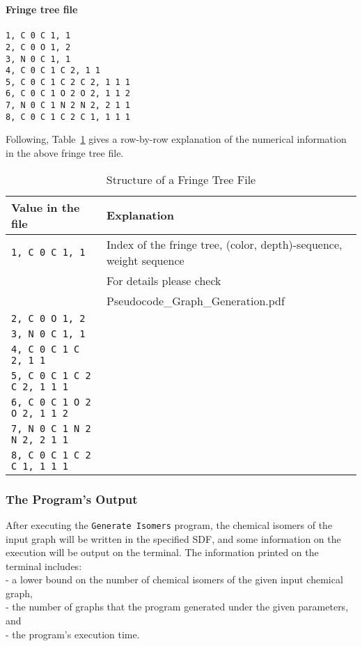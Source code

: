 \documentclass[11pt,titlepage,dvipdfmx,twoside]{article}
\begin{document}
\begin{oframed}
{\bf Fringe tree file}\\\\
{\tt1, C 0 C 1, 1            \\
2, C 0 O 1, 2            \\
3, N 0 C 1, 1            \\
4, C 0 C 1 C 2, 1 1      \\
5, C 0 C 1 C 2 C 2, 1 1 1\\
6, C 0 C 1 O 2 O 2, 1 1 2\\
7, N 0 C 1 N 2 N 2, 2 1 1\\
8, C 0 C 1 C 2 C 1, 1 1 1}\\
\end{oframed}
Following, Table~\ref{tab:fringeFormat}
gives a row-by-row explanation of the numerical information in the
above fringe tree file.
\bigskip
\begin{table}[H]
\begin{center} \caption{Structure of a Fringe Tree File}
\label{tab:fringeFormat}
  \begin{tabular}{l|l}
  Value in the file & Explanation \\ \hline \hline
{\tt  1, C 0 C 1, 1} & Index of the fringe tree, (color, depth)-sequence, weight sequence \\
      & For details please check \\
      & Pseudocode\_Graph\_Generation.pdf\\  \hline
{\tt 2, C 0 O 1, 2            } &\\
{\tt 3, N 0 C 1, 1            } &\\
{\tt 4, C 0 C 1 C 2, 1 1      } &\\
{\tt 5, C 0 C 1 C 2 C 2, 1 1 1} &\\
{\tt 6, C 0 C 1 O 2 O 2, 1 1 2} &\\
{\tt 7, N 0 C 1 N 2 N 2, 2 1 1} &\\
{\tt 8, C 0 C 1 C 2 C 1, 1 1 1} &\\ \hline
  \end{tabular}
\end{center}
\end{table}


\subsubsection{The Program's Output}
\label{sec:Output_m}

After executing the {\tt Generate Isomers} program,
the chemical isomers of the input graph will be written
in the specified SDF, and some information on the execution will be output on 
the terminal.
The information printed on the terminal includes:\\
 - a lower bound on the number of chemical isomers of the given input chemical graph, \\
 - the number of graphs that the program generated under the given parameters, and \\
 - the program's execution time.
 
\end{document}
